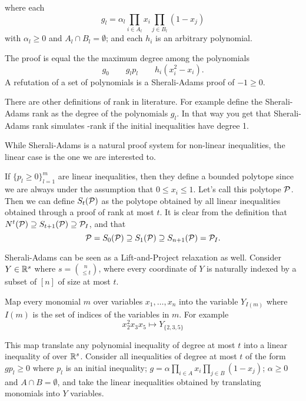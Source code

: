 \documentclass[a4paper,twoside,justified]{tufte-handout}
\begin{document}
where each 
\begin{equation}
  g_{l} = \alpha_{l} \prod_{i\in A_{l}} x_{i} \prod_{j \in
    B_{l}}(1-x_{j})  
\end{equation}
with $ \alpha_{l}\geq 0 $ and $ A_{l} \cap B_{l}=\emptyset $; and each
$ h_{i} $ is an arbitrary polynomial.

The 
proof is equal the the maximum degree among the polynomials 
\begin{equation}
g_{0} \qquad g_{l}p_{l} \qquad h_{i}(x^{2}_{i}- x_{i}).  
\end{equation}
%
A refutation of a set of polynomials is a Sherali-Adams proof of $ -1
\geq 0 $.

There are other definitions of rank in literature. For
example\cite{laurent01} define the Sherali-Adams rank as the degree of
the polynomials $ g_{l} $. In that way you get that Sherali-Adams rank
simulates \Lovasz-\Schrijver rank if the initial inequalities have
degree 1.


While Sherali-Adams is a natural proof system for non-linear
inequalities, the linear case is the one we are interested to.

If $ \{p_{l}\geq 0\}^{m}_{l=1} $ are linear inequalities, then they
define a bounded polytope since we are always under the assumption
that $0\leq x_{i}\leq 1 $. Let's call this polytope $ \mathcal{P} $. Then
we can define $ S_{t}(\mathcal{P}) $ as the polytope obtained by all
linear inequalities obtained through a proof of rank at most $ t $. It
is clear from the definition that $ N^{t}(\mathcal{P}) \supseteq
S_{t+1}(\mathcal{P}) \supseteq \mathcal{P}_{I} $, and that
\begin{equation}
  \mathcal{P}=S_{0}(\mathcal{P}) \supseteq S_{1}(\mathcal{P}) \supseteq
  S_{n+1}(\mathcal{P}) = \mathcal{P}_{I}.
\end{equation}


Sherali-Adams can be seen as a Lift-and-Project relaxation as
well. Consider $ Y\in \mathbb{R}^{s} $ where $ s=\binom{n}{\leq t} $,
where every coordinate of $ Y $ is naturally indexed by a subset
of $ [n] $ of size at most $ t $.

Map every monomial $m$ over variables $ x_{1}, \ldots, x_{n} $ into the variable $
Y_{I(m)}$ where $ I(m) $ is the set of indices of the variables in $ m
$.  For example
\begin{equation*}
x^{2}_{2} x_{3}x_{5} \mapsto Y_{\{2,3,5\}} 
\end{equation*}

This map translate any polynomial inequality of degree at most $ t $
into a linear inequality of over $ \mathbb{R}^{s} $. Consider all
inequalities of degree at most $t$ of the form $ g p_{l}\geq 0 $ where
$ p_{l} $ is an initial inequality; $ g = \alpha \prod_{i\in A} x_{i}
\prod_{j \in B}(1-x_{j}) $; $ \alpha\geq 0 $ and $ A\cap B=\emptyset
$, and take the linear inequalities obtained by translating monomials
into $Y$ variables.
\end{document}
